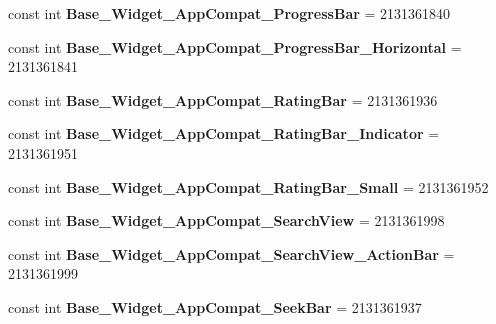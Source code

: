 \begin{DoxyCompactItemize}
const int {\bfseries Base\+\_\+\+Widget\+\_\+\+App\+Compat\+\_\+\+Progress\+Bar} = 2131361840
\item 
\mbox{\label{class_sample_app_1_1_droid_1_1_resource_1_1_style_a5f13985ba3002a511f7bf778c097b632}} 
const int {\bfseries Base\+\_\+\+Widget\+\_\+\+App\+Compat\+\_\+\+Progress\+Bar\+\_\+\+Horizontal} = 2131361841
\item 
\mbox{\label{class_sample_app_1_1_droid_1_1_resource_1_1_style_a8c79db2589e98a0672e36124c27f6ef4}} 
const int {\bfseries Base\+\_\+\+Widget\+\_\+\+App\+Compat\+\_\+\+Rating\+Bar} = 2131361936
\item 
\mbox{\label{class_sample_app_1_1_droid_1_1_resource_1_1_style_a2bf5c0c2d8d9eef6c1b3ce3e62df93d3}} 
const int {\bfseries Base\+\_\+\+Widget\+\_\+\+App\+Compat\+\_\+\+Rating\+Bar\+\_\+\+Indicator} = 2131361951
\item 
\mbox{\label{class_sample_app_1_1_droid_1_1_resource_1_1_style_a9eca73b4baafc68043c195f6caa044a9}} 
const int {\bfseries Base\+\_\+\+Widget\+\_\+\+App\+Compat\+\_\+\+Rating\+Bar\+\_\+\+Small} = 2131361952
\item 
\mbox{\label{class_sample_app_1_1_droid_1_1_resource_1_1_style_a115f855b38688acb0711054ea0763d4f}} 
const int {\bfseries Base\+\_\+\+Widget\+\_\+\+App\+Compat\+\_\+\+Search\+View} = 2131361998
\item 
\mbox{\label{class_sample_app_1_1_droid_1_1_resource_1_1_style_a4614af8dc9794b9d85422f2ebdd30d3a}} 
const int {\bfseries Base\+\_\+\+Widget\+\_\+\+App\+Compat\+\_\+\+Search\+View\+\_\+\+Action\+Bar} = 2131361999
\item 
\mbox{\label{class_sample_app_1_1_droid_1_1_resource_1_1_style_aac937de4fe1a24fc95be9f674e27e95f}} 
const int {\bfseries Base\+\_\+\+Widget\+\_\+\+App\+Compat\+\_\+\+Seek\+Bar} = 2131361937
\item 
\mbox{\label{class_sample_app_1_1_droid_1_1_resource_1_1_style_aadfdeeec6aca487c50189c7af903d1b5}} 

\end{DoxyCompactItemize}
